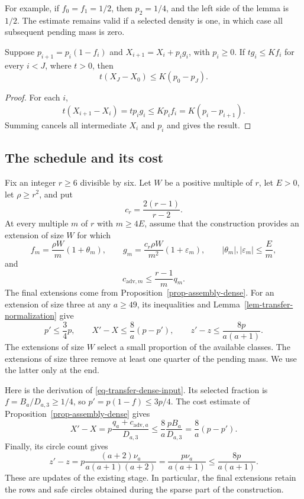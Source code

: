 For example, if $f_0=f_1=1/2$, then $p_2=1/4$, and the left side of
the lemma is $1/2$. The estimate remains valid if a selected density is
one, in which case all subsequent pending mass is zero.

\begin{lemma}\label{lem-transfer-cost}
Suppose $p_{i+1}=p_i(1-f_i)$ and $X_{i+1}=X_i+p_i g_i$, with
$p_i\ge0$. If $t g_i\le Kf_i$ for every $i<J$, where $t>0$, then
\[
 t(X_J-X_0)\le K(p_0-p_J).
\]
\end{lemma}

\begin{proof}
For each $i$,
\[
 t(X_{i+1}-X_i)=tp_i g_i
 \le Kp_i f_i=K(p_i-p_{i+1}).
\]
Summing cancels all intermediate $X_i$ and $p_i$ and gives the result.
\end{proof}

\subsection{The schedule and its cost}

Fix an integer $r\ge6$ divisible by six. Let $W$ be a positive multiple
of $r$, let $E>0$, let $\rho\ge r^2$, and put
\[
 c_r=\frac{2(r-1)}{r-2}.
\]
At every multiple $m$ of $r$ with $m\ge4E$, assume that the construction
provides an extension of size $W$ for which
\begin{equation}
 f_m=\frac{\rho W}{m}(1+\theta_m),\qquad
 g_m=\frac{c_r\rho W}{m^2}(1+\varepsilon_m),\qquad
 |\theta_m|,|\varepsilon_m|\le\frac{E}{m},
 \label{eq-transfer-sparse-input}
\end{equation}
and
\begin{equation}
 c_{\mathrm{adv},m}\le\frac{r-1}{m}q_m.
 \label{eq-transfer-circle-input}
\end{equation}
The final extensions come from Proposition~\ref{prop-assembly-dense}.
For an extension of size three at any $a\ge49$, its inequalities and
Lemma~\ref{lem-transfer-normalization} give
\begin{equation}
 p'\le\frac34p,\qquad
 X'-X\le\frac8a(p-p'),\qquad
 z'-z\le\frac{8p}{a(a+1)}.
 \label{eq-transfer-dense-input}
\end{equation}
The extensions of size $W$ select a small proportion of the available
classes. The extensions of size three remove at least one quarter of
the pending mass. We use the latter only at the end.

Here is the derivation of \eqref{eq-transfer-dense-input}. Its selected
fraction is $f=B_a/D_{a,3}\ge1/4$, so
$p'=p(1-f)\le3p/4$. The cost estimate of
Proposition~\ref{prop-assembly-dense} gives
\[
 X'-X=p\frac{q_a+c_{\mathrm{adv},a}}{D_{a,3}}
 \le\frac8a\frac{pB_a}{D_{a,3}}
 =\frac8a(p-p').
\]
Finally, its circle count gives
\[
 z'-z=p\frac{(a+2)\nu_a}{a(a+1)(a+2)}
 =\frac{p\nu_a}{a(a+1)}\le\frac{8p}{a(a+1)}.
\]
These are updates of the existing stage. In particular, the final
extensions retain the rows and safe circles obtained during the sparse
part of the construction.

